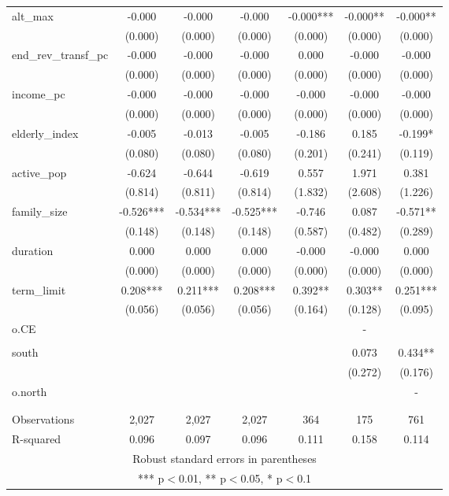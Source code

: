 \documentclass[]{article}
\begin{document}
\begin{tabular}{lcccccc}
alt\_max & -0.000 & -0.000 & -0.000 & -0.000*** & -0.000** & -0.000** \\
 & (0.000) & (0.000) & (0.000) & (0.000) & (0.000) & (0.000) \\
end\_rev\_transf\_pc & -0.000 & -0.000 & -0.000 & 0.000 & -0.000 & -0.000 \\
 & (0.000) & (0.000) & (0.000) & (0.000) & (0.000) & (0.000) \\
income\_pc & -0.000 & -0.000 & -0.000 & -0.000 & -0.000 & -0.000 \\
 & (0.000) & (0.000) & (0.000) & (0.000) & (0.000) & (0.000) \\
elderly\_index & -0.005 & -0.013 & -0.005 & -0.186 & 0.185 & -0.199* \\
 & (0.080) & (0.080) & (0.080) & (0.201) & (0.241) & (0.119) \\
active\_pop & -0.624 & -0.644 & -0.619 & 0.557 & 1.971 & 0.381 \\
 & (0.814) & (0.811) & (0.814) & (1.832) & (2.608) & (1.226) \\
family\_size & -0.526*** & -0.534*** & -0.525*** & -0.746 & 0.087 & -0.571** \\
 & (0.148) & (0.148) & (0.148) & (0.587) & (0.482) & (0.289) \\
duration & 0.000 & 0.000 & 0.000 & -0.000 & -0.000 & 0.000 \\
 & (0.000) & (0.000) & (0.000) & (0.000) & (0.000) & (0.000) \\
term\_limit & 0.208*** & 0.211*** & 0.208*** & 0.392** & 0.303** & 0.251*** \\
 & (0.056) & (0.056) & (0.056) & (0.164) & (0.128) & (0.095) \\
o.CE &  &  &  &  & - &  \\
 &  &  &  &  &  &  \\
south &  &  &  &  & 0.073 & 0.434** \\
 &  &  &  &  & (0.272) & (0.176) \\
o.north &  &  &  &  &  & - \\
 &  &  &  &  &  &  \\
 &  &  &  &  &  &  \\
Observations & 2,027 & 2,027 & 2,027 & 364 & 175 & 761 \\
 R-squared & 0.096 & 0.097 & 0.096 & 0.111 & 0.158 & 0.114 \\ \hline
\multicolumn{7}{c}{ Robust standard errors in parentheses} \\
\multicolumn{7}{c}{ *** p$<$0.01, ** p$<$0.05, * p$<$0.1} \\
\end{tabular}
\end{document}

